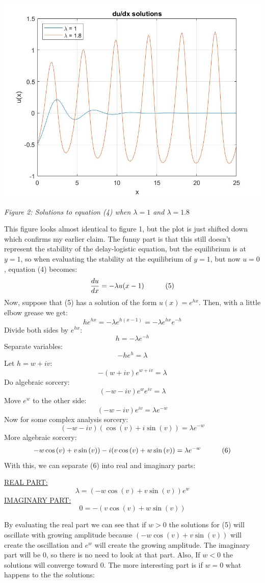 \documentclass{article}
\begin{document}
\bigskip
\begin{center}
\includegraphics[width=15cm]{du solution 2 lam.jpg}

\textit{Figure 2: Solutions to equation (4) when $\lambda = 1$ and $\lambda = 1.8$}

\end{center}
\bigskip
This figure looks almost identical to figure 1, but the plot is just shifted down which confirms my earlier claim. The funny part is that this still doesn't represent the stability of the delay-logistic equation, but the equilibrium is at $y=1$, so when evaluating the stability at the equilibrium of $y=1$, but now $u=0$, equation (4) becomes:
$$\frac{du}{dx} = -\lambda u(x-1)\indent\indent (5)$$
Now, suppose that (5) has a solution of the form $u(x) = e^{hx}$. Then, with a little elbow grease we get:
$$he^{hx} = -\lambda e^{h(x-1)} = -\lambda e^{hx} e^{-h}$$
Divide both sides by $e^{hx}$:
$$h = -\lambda e^{-h}$$
Separate variables:
$$-he^h = \lambda$$
Let $h = w +iv$:
$$-(w+iv)e^{w+iv} = \lambda$$
Do algebraic sorcery:
 $$(-w-iv) e^w e^{iv} = \lambda$$
Move $e^w$ to the other side:
$$(-w-iv) e^{iv} = \lambda e^{-w}$$
Now for some complex analysis sorcery:
$$(-w-iv) (\cos{(v)} + i\sin{(v)}) = \lambda e^{-w}$$
More algebraic sorcery:
$$ -w\cos{(v)} + v\sin{(v)}) - i(v\cos{(v)} + w\sin{(v)}) = \lambda e^{-w} \indent \indent (6)$$
With this, we can separate (6) into real and imaginary parts:

\begin{center}
\underline{REAL PART:}
$$\boxed{\lambda = (-w\cos{(v)} + v\sin{(v)}) e^w}$$
\underline{IMAGINARY PART:}
$$\boxed{0 = -(v\cos{(v)} + w\sin{(v)})}$$
\end{center}
By evaluating the real part we can see that if $w > 0$ the solutions for (5) will oscillate with growing amplitude because 
$(-w\cos{(v)} + v\sin{(v)})$ will create the oscillation and $e^w$ will create the growing amplitude. The imaginary part will be $0$, 
so there is no need to look at that part. Also, If $w < 0$ the solutions will converge toward $0$. The more interesting part is if $w = 0$ what happens to the the solutions:
\end{document}
